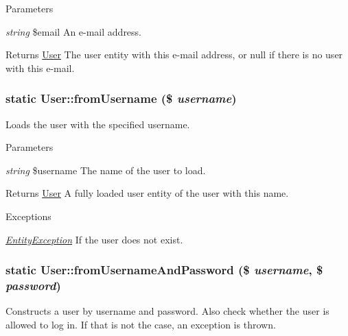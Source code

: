 \begin{DoxyParams}{Parameters}
\item[{\em string}]\$email An e-\/mail address.\end{DoxyParams}
\begin{DoxyReturn}{Returns}
\hyperlink{classUser}{User} The user entity with this e-\/mail address, or null if there is no user with this e-\/mail. 
\end{DoxyReturn}
\hypertarget{classUser_acf26289b127b63a907e1bc97411001ed}{
\subsubsection[{fromUsername}]{\setlength{\rightskip}{0pt plus 5cm}static User::fromUsername (\$ {\em username})}}
\label{classUser_acf26289b127b63a907e1bc97411001ed}
Loads the user with the specified username.


\begin{DoxyParams}{Parameters}
\item[{\em string}]\$username The name of the user to load.\end{DoxyParams}
\begin{DoxyReturn}{Returns}
\hyperlink{classUser}{User} A fully loaded user entity of the user with this name.
\end{DoxyReturn}

\begin{DoxyExceptions}{Exceptions}
\item[{\em \hyperlink{classEntityException}{EntityException}}]If the user does not exist. \end{DoxyExceptions}
\hypertarget{classUser_a62cc6354245bb44c7f24cea5bf9cd2ec}{
\subsubsection[{fromUsernameAndPassword}]{\setlength{\rightskip}{0pt plus 5cm}static User::fromUsernameAndPassword (\$ {\em username}, \/  \$ {\em password})}}
\label{classUser_a62cc6354245bb44c7f24cea5bf9cd2ec}
Constructs a user by username and password. Also check whether the user is allowed to log in. If that is not the case, an exception is thrown.


